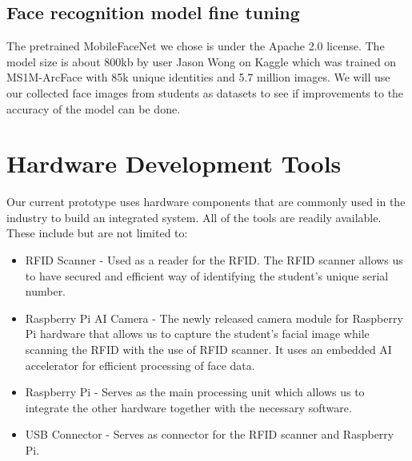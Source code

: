 \subsection{Face recognition model fine tuning}
The pretrained MobileFaceNet we chose is under the Apache 2.0 license. The model size is about 800kb by user Jason Wong on Kaggle which was trained on MS1M-ArcFace with 85k unique identities and 5.7 million images. We will use our collected face images from students as datasets to see if improvements to the accuracy of the model can be done.

\section{Hardware Development Tools}
Our current prototype uses hardware components that are commonly used in the industry to build an integrated system. All of the tools are readily available. These include but are not limited to:

\begin{itemize}
	\item	RFID Scanner - Used as a reader for the RFID. The RFID scanner allows us to have secured and efficient way of identifying the student's unique serial number.

\end{itemize}

\begin{itemize}
	\item	Raspberry Pi AI Camera - The newly released camera module for Raspberry Pi hardware that allows us to capture the student's facial image while scanning the RFID with the use of RFID scanner. It uses an embedded AI accelerator for efficient processing of face data.
	
\end{itemize} 

\begin{itemize}
	\item	Raspberry Pi - Serves as the main processing unit which allows us to integrate the other hardware together with the necessary software.
	
\end{itemize}

\begin{itemize}
	\item	USB Connector -  Serves as connector for the RFID scanner and Raspberry Pi.
	
\end{itemize}

